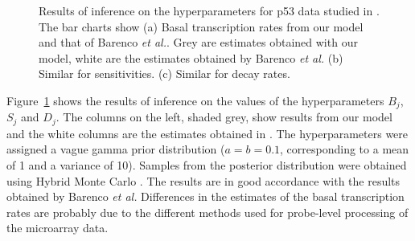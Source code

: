 \documentclass[english]{article}
\begin{document}
\begin{figure}[ht]\vspace{-0.2cm}
\begin{center}\hfill{}\hfill{}\end{center}

\vspace{-0.8cm}
\caption{\small Results of inference on the hyperparameters for p53 data studied in \cite{Barenco:ranked06}.
The bar charts show (a) Basal transcription rates from our model and
that of Barenco \emph{et al.}. Grey are estimates obtained with our model, 
white are the estimates obtained by Barenco \emph{et al.} 
(b) Similar for sensitivities.
(c) Similar for decay rates.\label{cap:barencoComparisonBar}}\vspace{-0.3cm}
\end{figure}

Figure~\ref{cap:barencoComparisonBar} shows the results of inference on the 
values of the hyperparameters $B_j$, $S_j$ and $D_j$. The columns on the left,
shaded grey, show results from our model and the white columns are the
estimates obtained in \cite{Barenco:ranked06}. The hyperparameters were assigned a 
vague gamma prior distribution ($a=b=0.1$, corresponding to a mean of 1 and a 
variance of 10). Samples from the posterior distribution were obtained using
Hybrid Monte Carlo \cite[see \emph{e.g.}][]{Neal:book96}. The results are
in good accordance with the results obtained by Barenco \emph{et al.} 
Differences in the estimates of the basal transcription rates are probably 
due to the different methods used for probe-level processing of the microarray
data. 
\end{document}
